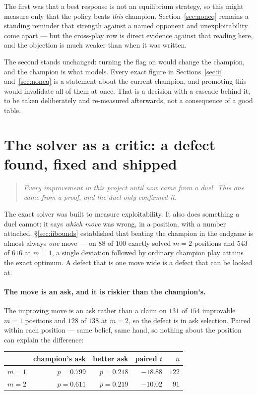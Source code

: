 \documentclass[11pt,a4paper]{article}
\begin{document}
The first was that a best response is not an equilibrium strategy, so this
might measure only that the policy beats \emph{this} champion.
Section~\ref{sec:noneq} remains a standing reminder that strength against a
named opponent and unexploitability come apart --- but the cross-play row is
direct evidence against that reading here, and the objection is much weaker
than when it was written.

The second stands unchanged: turning the flag on would change the champion, and
the champion is what  models. Every exact figure in
Sections~\ref{sec:ii} and~\ref{sec:noneq} is a statement about the current
champion, and promoting this would invalidate all of them at once. That is a
decision with a cascade behind it, to be taken deliberately and re-measured
afterwards, not a consequence of a good table.

\section{The solver as a critic: a defect found, fixed and shipped}
\label{sec:critic}

\begin{quote}
\emph{Every improvement in this project until now came from a duel. This one
came from a proof, and the duel only confirmed it.}
\end{quote}

The exact solver was built to measure exploitability. It also does something a
duel cannot: it says \emph{which move} was wrong, in a position, with a number
attached. \S\ref{sec:iibounds} established that beating the champion in the
endgame is almost always \emph{one} move --- on $88$ of $100$ exactly solved
$m = 2$ positions and $543$ of $616$ at $m = 1$, a single deviation followed by
ordinary champion play attains the exact optimum. A defect that is one move
wide is a defect that can be looked at.

\paragraph{The move is an ask, and it is riskier than the champion's.} The
improving move is an ask rather than a claim on $131$ of $154$ improvable
$m = 1$ positions and $128$ of $138$ at $m = 2$, so the defect is in ask
selection. Paired within each position --- same belief, same hand, so nothing
about the position can explain the difference:

\begin{center}
\begin{tabular}{lrrrr}
\toprule
& champion's ask & better ask & paired $t$ & $n$ \\
\midrule
$m = 1$ & $p = 0.799$ & $p = 0.218$ & $-18.88$ & $122$ \\
$m = 2$ & $p = 0.611$ & $p = 0.219$ & $-10.02$ & $91$ \\
\bottomrule
\end{tabular}
\end{center}
\end{document}
